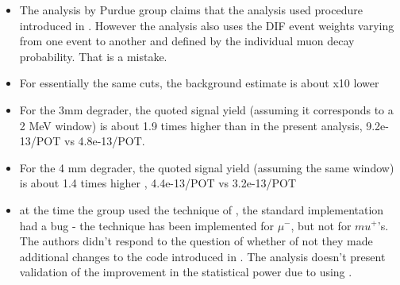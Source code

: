 \begin{itemize}
\item
  The analysis by Purdue group claims that the analysis used procedure introduced
  in \cite{KRZYSZTOF}. However the analysis also uses the DIF event weights
  varying from one event to another and defined by the individual muon decay probability.
  That is a mistake.
\item
  For essentially the same cuts, the background estimate is about x10 lower
\item
  For the 3mm degrader, the quoted signal yield (assuming it corresponds to a 2 MeV window)
  is about 1.9 times higher than in the present analysis, 9.2e-13/POT vs 4.8e-13/POT.
\item
  For the 4 mm degrader, the quoted signal yield (assuming the same window) 
  is about 1.4 times higher , 4.4e-13/POT vs 3.2e-13/POT
\item
  at the time the group used the technique of \cite{KRZYSZTOF}, the standard implementation
  had a bug - the technique has been implemented for $\mu^-$, but not for $mu^+$'s.
  The authors didn't respond to the question of whether of not
  they made additional changes to the code introduced in \cite{KRZYSZTOF}.
  The analysis doesn't present validation of the improvement in the statistical power due
  to using \cite{KRZYSZTOF}. 
\end{itemize}


